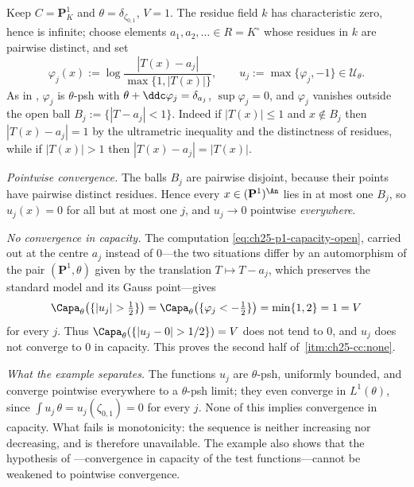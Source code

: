 \begin{example}
\label{ex:ch25-pointwise-not-capacity}
Keep $C=\mathbf P^1_K$ and $\theta=\delta_{\zeta_{0,1}}$, $V=1$.  The
residue field $k$ has characteristic zero, hence is infinite; choose
elements $a_1,a_2,\ldots\in R=K^\circ$ whose residues in $k$ are pairwise
distinct, and set
\[
 \varphi_j(x):=\log\frac{|T(x)-a_j|}{\max\{1,|T(x)|\}},
 \qquad
 u_j:=\max\{\varphi_j,-1\}\in\mathcal U_\theta .
\]
As in , $\varphi_j$ is $\theta$-psh
with $\theta+\ddc\varphi_j=\delta_{a_j}$, $\sup\varphi_j=0$, and
$\varphi_j$ vanishes outside the open ball
$B_j:=\{|T-a_j|<1\}$.  Indeed if $|T(x)|\leq1$ and $x\notin B_j$ then
$|T(x)-a_j|=1$ by the ultrametric inequality and the distinctness of
residues, while if $|T(x)|>1$ then $|T(x)-a_j|=|T(x)|$.

\emph{Pointwise convergence.}  The balls $B_j$ are pairwise disjoint,
because their points have pairwise distinct residues.  Hence every
$x\in(\mathbf P^1)^{\An}$ lies in at most one $B_j$, so $u_j(x)=0$ for
all but at most one $j$, and $u_j\to0$ pointwise \emph{everywhere}.

\emph{No convergence in capacity.}  The computation
\eqref{eq:ch25-p1-capacity-open}, carried out at the centre $a_j$ instead of
$0$---the two situations differ by an automorphism of the pair
$(\mathbf P^1,\theta)$ given by the translation $T\mapsto T-a_j$, which
preserves the standard model and its Gauss point---gives
\[
 \Capa_\theta\bigl(\{|u_j|>\tfrac12\}\bigr)
 =\Capa_\theta\bigl(\{\varphi_j<-\tfrac12\}\bigr)
 =\min\{1,2\}=1=V
\]
for every $j$.  Thus $\Capa_\theta(\{|u_j-0|>1/2\})=V$ does not tend to
$0$, and $u_j$ does not converge to $0$ in capacity.  This proves the
second half of
\,\cref{itm:ch25-cc:none}.

\emph{What the example separates.}  The functions $u_j$ are
$\theta$-psh, uniformly bounded, and converge pointwise everywhere to a
$\theta$-psh limit; they even converge in $L^1(\theta)$, since
$\int u_j\,\theta=u_j(\zeta_{0,1})=0$ for every $j$.  None of this
implies convergence in capacity.  What fails is monotonicity: the sequence
is neither increasing nor decreasing, and
 is therefore unavailable.  The
example also shows that the hypothesis of
---convergence in capacity of the test
functions---cannot be weakened to pointwise convergence.
\end{example}

